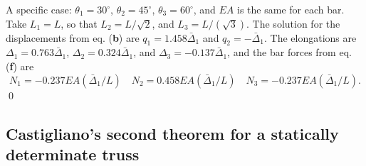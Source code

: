 \documentclass{AeroStructure-ERJohnson}
\begin{document}
\begin{example*}
A specific case: $\theta_{1}=30^{\circ}$, $\theta_{2}=45^{\circ}$, $\theta_{3}=60^{\circ}$, and $E A$ is the same for each bar. Take $L_{1}=L$, so that $L_{2}=L / \sqrt{2}$, and $L_{3}=L /(\sqrt{3})$. The solution for the displacements from eq. (\textbf{b}) are $q_{1}=1.458 \bar{\Delta}_{1}$ and $q_{2}=-\bar{\Delta}_{1}$. The elongations are $\Delta_{1}=0.763 \bar{\Delta}_{1}$, $\Delta_{2}=0.324 \bar{\Delta}_{1}$, and $\Delta_{3}=-0.137 \bar{\Delta}_{1}$, and the bar forces from eq. (\textbf{f}) are
\begin{equation}
N_{1}=-0.237 E A\left(\bar{\Delta}_{1} / L\right) \quad N_{2}=0.458 E A\left(\bar{\Delta}_{1} / L\right) \quad N_{3}=-0.237 E A\left(\bar{\Delta}_{1} / L\right).\tag{g}
\end{equation}\hfill\qed
\end{example*}

\subsection{Castigliano's second theorem for a statically determinate truss}\label{sec6.1.2}
\end{document}

